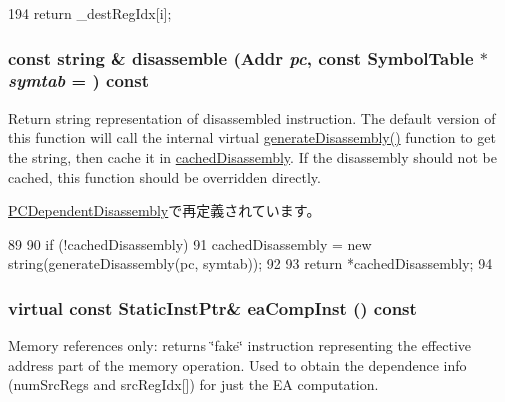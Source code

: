 \begin{DoxyCode}
194 { return _destRegIdx[i]; }
\end{DoxyCode}
\hypertarget{classStaticInst_acce45da56f8154aec68848514c4f819f}{
\subsubsection[{disassemble}]{\setlength{\rightskip}{0pt plus 5cm}const string \& disassemble ({\bf Addr} {\em pc}, \/  const SymbolTable $\ast$ {\em symtab} = {}) const}}
\label{classStaticInst_acce45da56f8154aec68848514c4f819f}
Return string representation of disassembled instruction. The default version of this function will call the internal virtual \hyperlink{classStaticInst_ab4a569d2623620c04f8a52bbd91d63b9}{generateDisassembly()} function to get the string, then cache it in \hyperlink{classStaticInst_aca407a93c3360ff06d5d52f92583a6e1}{cachedDisassembly}. If the disassembly should not be cached, this function should be overridden directly. 

\hyperlink{classPowerISA_1_1PCDependentDisassembly_a8b5fcb5ee981f062dfbdd09d676922f6}{PCDependentDisassembly}で再定義されています。


\begin{DoxyCode}
89 {
90     if (!cachedDisassembly)
91         cachedDisassembly = new string(generateDisassembly(pc, symtab));
92 
93     return *cachedDisassembly;
94 }
\end{DoxyCode}
\hypertarget{classStaticInst_ad814fb0b7773dc1fae7dffac00156583}{
\subsubsection[{eaCompInst}]{\setlength{\rightskip}{0pt plus 5cm}virtual const {\bf StaticInstPtr}\& eaCompInst () const}}
\label{classStaticInst_ad814fb0b7773dc1fae7dffac00156583}
Memory references only: returns \char`\"{}fake\char`\"{} instruction representing the effective address part of the memory operation. Used to obtain the dependence info (numSrcRegs and srcRegIdx\mbox{[}\mbox{]}) for just the EA computation. 


